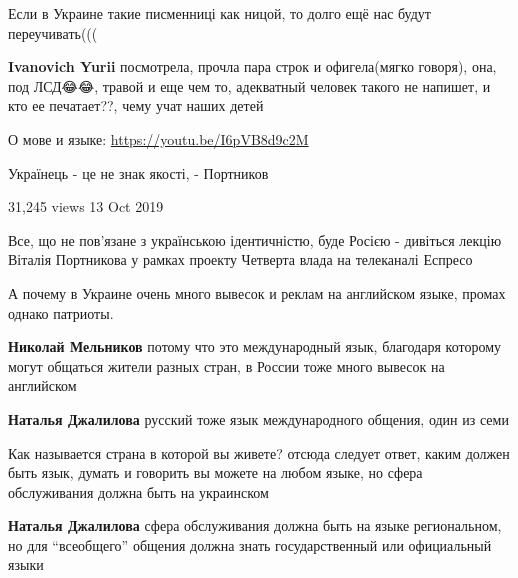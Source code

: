 \begin{itemize}
Если в Украине такие писменниці как ницой, то долго ещё нас будут
переучивать(((

\textbf{Ivanovich Yurii} посмотрела, прочла пара строк и офигела(мягко говоря),
она, под ЛСД😂😂, травой и еще чем то, адекватный человек такого не напишет, и
кто ее печатает??, чему учат наших детей

О мове и языке:
\url{https://youtu.be/I6pVB8d9c2M}\par
Українець - це не знак якості, - Портников\par
31,245 views 13 Oct 2019\par 
Все, що не пов'язане з українською ідентичністю, буде Росією - дивіться лекцію
Віталія Портникова у рамках проекту Четверта влада на телеканалі Еспресо\par


А почему в Украине очень много вывесок и реклам на английском языке, промах
однако патриоты.

\begin{itemize}
\textbf{Николай Мельников} потому что это международный язык, благодаря
которому могут общаться жители разных стран, в России тоже много вывесок на
английском


\textbf{Наталья Джалилова} русский тоже язык международного общения, один из семи
\end{itemize}


Как называется страна в которой вы живете? отсюда следует ответ, каким должен
быть язык, думать и говорить вы можете на любом языке, но сфера обслуживания
должна быть на украинском

\begin{itemize}
\textbf{Наталья Джалилова} сфера обслуживания должна быть на языке
региональном, но для \enquote{всеобщего} общения должна знать государственный или
официальный языки


\end{itemize}
\end{itemize}
